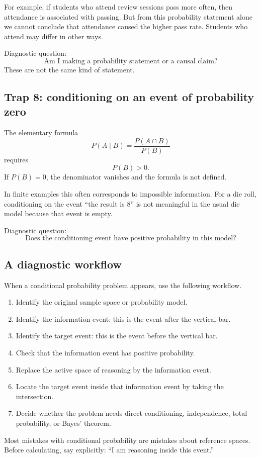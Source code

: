 For example, if students who attend review sessions pass more often, then
attendance is associated with passing. But from this probability statement alone
we cannot conclude that attendance caused the higher pass rate. Students who
attend may differ in other ways.

Diagnostic question:
\[
\text{Am I making a probability statement or a causal claim?}
\]
These are not the same kind of statement.

\subsection*{Trap 8: conditioning on an event of probability zero}

The elementary formula
\[
P(A\mid B)=\frac{P(A\cap B)}{P(B)}
\]
requires
\[
P(B)>0.
\]
If \(P(B)=0\), the denominator vanishes and the formula is not defined.

In finite examples this often corresponds to impossible information. For a die
roll, conditioning on the event ``the result is \(8\)'' is not meaningful in the
usual die model because that event is empty.

Diagnostic question:
\[
\text{Does the conditioning event have positive probability in this model?}
\]

\subsection*{A diagnostic workflow}

When a conditional probability problem appears, use the following workflow.

\begin{enumerate}
    \item Identify the original sample space or probability model.
    \item Identify the information event: this is the event after the vertical
    bar.
    \item Identify the target event: this is the event before the vertical bar.
    \item Check that the information event has positive probability.
    \item Replace the active space of reasoning by the information event.
    \item Locate the target event inside that information event by taking the
    intersection.
    \item Decide whether the problem needs direct conditioning, independence,
    total probability, or Bayes' theorem.
\end{enumerate}

\begin{theorembox}
Most mistakes with conditional probability are mistakes about reference spaces.
Before calculating, say explicitly: ``I am reasoning inside this event.''
\end{theorembox}
